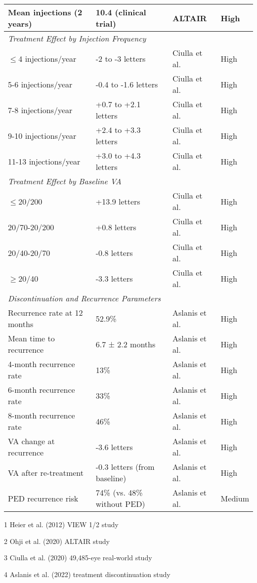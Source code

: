 \begin{table}[h]
\begin{threeparttable}
\begin{tabular}{p{4.5cm}p{5cm}p{3.5cm}p{2cm}}
Mean injections (2 years) & 10.4 (clinical trial) & ALTAIR\tnote{2} & High \\
\hline
\multicolumn{4}{l}{\textit{Treatment Effect by Injection Frequency}} \\
\hline
$\leq$4 injections/year & -2 to -3 letters & Ciulla et al.\tnote{3} & High \\
5-6 injections/year & -0.4 to -1.6 letters & Ciulla et al.\tnote{3} & High \\
7-8 injections/year & +0.7 to +2.1 letters & Ciulla et al.\tnote{3} & High \\
9-10 injections/year & +2.4 to +3.3 letters & Ciulla et al.\tnote{3} & High \\
11-13 injections/year & +3.0 to +4.3 letters & Ciulla et al.\tnote{3} & High \\
\hline
\multicolumn{4}{l}{\textit{Treatment Effect by Baseline VA}} \\
\hline
$\leq$20/200 & +13.9 letters & Ciulla et al.\tnote{3} & High \\
20/70-20/200 & +0.8 letters & Ciulla et al.\tnote{3} & High \\
20/40-20/70 & -0.8 letters & Ciulla et al.\tnote{3} & High \\
$\geq$20/40 & -3.3 letters & Ciulla et al.\tnote{3} & High \\
\hline
\multicolumn{4}{l}{\textit{Discontinuation and Recurrence Parameters}} \\
\hline
Recurrence rate at 12 months & 52.9\% & Aslanis et al.\tnote{4} & High \\
Mean time to recurrence & 6.7 ± 2.2 months & Aslanis et al.\tnote{4} & High \\
4-month recurrence rate & 13\% & Aslanis et al.\tnote{4} & High \\
6-month recurrence rate & 33\% & Aslanis et al.\tnote{4} & High \\
8-month recurrence rate & 46\% & Aslanis et al.\tnote{4} & High \\
VA change at recurrence & -3.6 letters & Aslanis et al.\tnote{4} & High \\
VA after re-treatment & -0.3 letters (from baseline) & Aslanis et al.\tnote{4} & High \\
PED recurrence risk & 74\% (vs. 48\% without PED) & Aslanis et al.\tnote{4} & Medium \\
\hline
\end{tabular}
\begin{tablenotes}
\small
\item[1] Heier et al. (2012) VIEW 1/2 study \citep{heierIntravitrealAfliberceptVEGF2012}
\item[2] Ohji et al. (2020) ALTAIR study \citep{ohjiEfficacySafetyIntravitreal2020}
\item[3] Ciulla et al. (2020) 49,485-eye real-world study \citep{ciullaVisualAcuityOutcomes2020}
\item[4] Aslanis et al. (2022) treatment discontinuation study \citep{aslanisRecurrentNeovascularAgeRelated2022}
\end{tablenotes}
\end{threeparttable}
\end{table}

